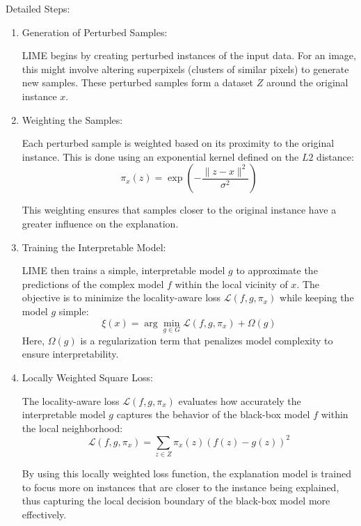 \documentclass{article}
\begin{document}
Detailed Steps:
\begin{enumerate}
    
    \item Generation of Perturbed Samples: 
    
    LIME begins by creating perturbed instances of the input data. For an image, this might involve altering superpixels (clusters of similar pixels) to generate new samples. These perturbed samples form a dataset $Z$ around the original instance $x$.
    
    
    \item Weighting the Samples: 
    
    Each perturbed sample is weighted based on its proximity to the original instance. This is done using an exponential kernel defined on the $L2$ distance:
    \begin{equation}
    \pi_x(z) = \exp\left(-\frac{\|z - x\|^2}{\sigma^2}\right)
    \end{equation}
    
    This weighting ensures that samples closer to the original instance have a greater influence on the explanation.
    
    
    \item Training the Interpretable Model:
    
    LIME then trains a simple, interpretable model $g$ to approximate the predictions of the complex model $f$ within the local vicinity of $x$. The objective is to minimize the locality-aware loss $\mathcal{L}(f, g, \pi_x)$ while keeping the model $g$ simple:
    \begin{equation}
    \xi(x) = \arg\min_{g \in G} \mathcal{L}(f, g, \pi_x) + \Omega(g)    
    \end{equation}
    Here, $\Omega(g)$ is a regularization term that penalizes model complexity to ensure interpretability.
    
    
    \item Locally Weighted Square Loss:
    
    The locality-aware loss $\mathcal{L}(f, g, \pi_x)$ evaluates how accurately the interpretable model $g$ captures the behavior of the black-box model $f$ within the local neighborhood:
    \begin{equation}    
    \mathcal{L}(f, g, \pi_x) = \sum_{z \in Z} \pi_x(z)(f(z) - g(z))^2
    \end{equation}
    
    By using this locally weighted loss function, the explanation model is trained to focus more on instances that are closer to the instance being explained, thus capturing the local decision boundary of the black-box model more effectively.
    
\end{enumerate}
\end{document}
